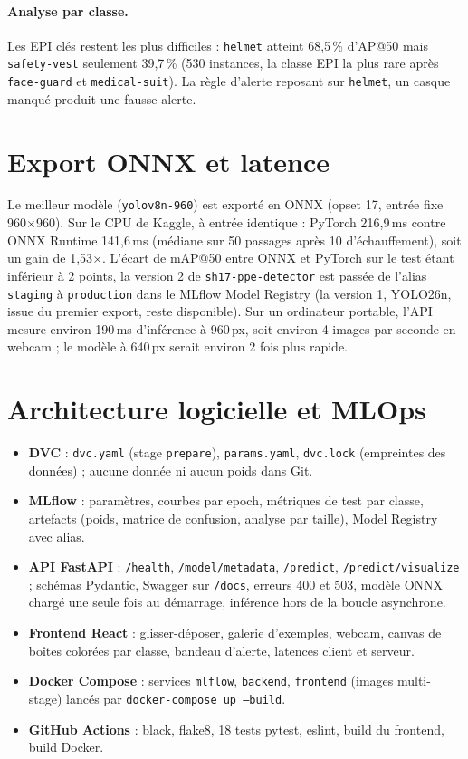 \documentclass[11pt,a4paper]{article}
\begin{document}
\paragraph{Analyse par classe.} Les EPI clés restent les plus difficiles : \texttt{helmet} atteint 68,5\,\%
d'AP@50 mais \texttt{safety-vest} seulement 39,7\,\% (530 instances, la classe EPI la plus rare après
\texttt{face-guard} et \texttt{medical-suit}). La règle d'alerte reposant sur \texttt{helmet}, un casque
manqué produit une fausse alerte.

\section{Export ONNX et latence}
Le meilleur modèle (\texttt{yolov8n-960}) est exporté en ONNX (opset 17, entrée fixe 960$\times$960).
Sur le CPU de Kaggle, à entrée identique : PyTorch 216,9\,ms contre ONNX Runtime 141,6\,ms (médiane sur 50
passages après 10 d'échauffement), soit un gain de 1,53$\times$. L'écart de mAP@50 entre ONNX et PyTorch sur le
test étant inférieur à 2 points, la version 2 de \texttt{sh17-ppe-detector} est passée de l'alias
\texttt{staging} à \texttt{production} dans le MLflow Model Registry (la version 1, YOLO26n, issue du premier
export, reste disponible). Sur un ordinateur portable, l'API mesure environ 190\,ms d'inférence à 960\,px,
soit environ 4 images par seconde en webcam ; le modèle à 640\,px serait environ 2 fois plus rapide.

\section{Architecture logicielle et MLOps}
\begin{itemize}
  \item \textbf{DVC} : \texttt{dvc.yaml} (stage \texttt{prepare}), \texttt{params.yaml}, \texttt{dvc.lock}
        (empreintes des données) ; aucune donnée ni aucun poids dans Git.
  \item \textbf{MLflow} : paramètres, courbes par epoch, métriques de test par classe, artefacts
        (poids, matrice de confusion, analyse par taille), Model Registry avec alias.
  \item \textbf{API FastAPI} : \texttt{/health}, \texttt{/model/metadata}, \texttt{/predict},
        \texttt{/predict/visualize} ; schémas Pydantic, Swagger sur \texttt{/docs}, erreurs 400 et 503,
        modèle ONNX chargé une seule fois au démarrage, inférence hors de la boucle asynchrone.
  \item \textbf{Frontend React} : glisser-déposer, galerie d'exemples, webcam, canvas de boîtes
        colorées par classe, bandeau d'alerte, latences client et serveur.
  \item \textbf{Docker Compose} : services \texttt{mlflow}, \texttt{backend}, \texttt{frontend}
        (images multi-stage) lancés par \texttt{docker-compose up --build}.
  \item \textbf{GitHub Actions} : black, flake8, 18 tests pytest, eslint, build du frontend, build Docker.
\end{itemize}
\end{document}
